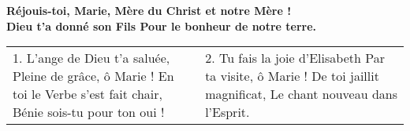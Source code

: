 
\textbf{
Réjouis-toi, Marie,
Mère du Christ et notre Mère !\\
Dieu t’a donné son Fils
Pour le bonheur de notre terre.
}

\begin{tabular}{@{}p{} p{}@{}}
1.
L’ange de Dieu t’a saluée,\newline
Pleine de grâce, ô Marie !\newline
En toi le Verbe s’est fait chair,\newline
Bénie sois-tu pour ton oui !
&
2.
Tu fais la joie d’Elisabeth\newline
Par ta visite, ô Marie !\newline
De toi jaillit magnificat,\newline
Le chant nouveau dans l’Esprit.
\end{tabular}

